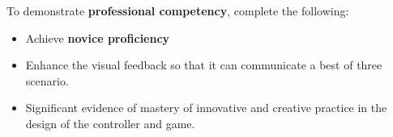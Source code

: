 \documentclass{../../../../fal_assignment}
\begin{document}
To demonstrate \textbf{professional competency}, complete the following:
\begin{itemize}
	\item Achieve \textbf{novice proficiency}
	\item Enhance the visual feedback so that it can communicate a best of three scenario.
	\item Significant evidence of mastery of innovative and creative practice  in the design of the controller and game.
\end{itemize}
\end{document}

